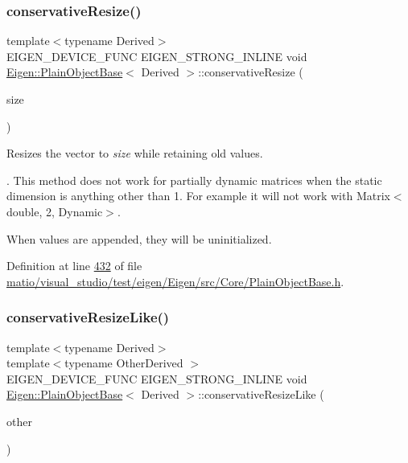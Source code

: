 \subsubsection{\texorpdfstring{conservative\+Resize()}{conservativeResize()}\hspace{0.1cm}{\footnotesize\ttfamily [8/8]}}
{\footnotesize\ttfamily template$<$typename Derived$>$ \\
E\+I\+G\+E\+N\+\_\+\+D\+E\+V\+I\+C\+E\+\_\+\+F\+U\+NC E\+I\+G\+E\+N\+\_\+\+S\+T\+R\+O\+N\+G\+\_\+\+I\+N\+L\+I\+NE void \hyperlink{class_eigen_1_1_plain_object_base}{Eigen\+::\+Plain\+Object\+Base}$<$ Derived $>$\+::conservative\+Resize (\begin{DoxyParamCaption}\item[{\hyperlink{namespace_eigen_a62e77e0933482dafde8fe197d9a2cfde}{Index}}]{size }\end{DoxyParamCaption})\hspace{0.3cm}{\ttfamily [inline]}}

Resizes the vector to {\itshape size} while retaining old values.

. This method does not work for partially dynamic matrices when the static dimension is anything other than 1. For example it will not work with Matrix$<$double, 2, Dynamic$>$.

When values are appended, they will be uninitialized. 

Definition at line \hyperlink{matio_2visual__studio_2test_2eigen_2_eigen_2src_2_core_2_plain_object_base_8h_source_l00432}{432} of file \hyperlink{matio_2visual__studio_2test_2eigen_2_eigen_2src_2_core_2_plain_object_base_8h_source}{matio/visual\+\_\+studio/test/eigen/\+Eigen/src/\+Core/\+Plain\+Object\+Base.\+h}.

\mbox{\label{class_eigen_1_1_plain_object_base_a7775d274035c4ef541aa0fc9a3ad30a2}} 
\subsubsection{\texorpdfstring{conservative\+Resize\+Like()}{conservativeResizeLike()}\hspace{0.1cm}{\footnotesize\ttfamily [1/2]}}
{\footnotesize\ttfamily template$<$typename Derived$>$ \\
template$<$typename Other\+Derived $>$ \\
E\+I\+G\+E\+N\+\_\+\+D\+E\+V\+I\+C\+E\+\_\+\+F\+U\+NC E\+I\+G\+E\+N\+\_\+\+S\+T\+R\+O\+N\+G\+\_\+\+I\+N\+L\+I\+NE void \hyperlink{class_eigen_1_1_plain_object_base}{Eigen\+::\+Plain\+Object\+Base}$<$ Derived $>$\+::conservative\+Resize\+Like (\begin{DoxyParamCaption}\item[{const \hyperlink{group___core___module_class_eigen_1_1_dense_base}{Dense\+Base}$<$ Other\+Derived $>$ \&}]{other }\end{DoxyParamCaption})\hspace{0.3cm}{\ttfamily [inline]}}


